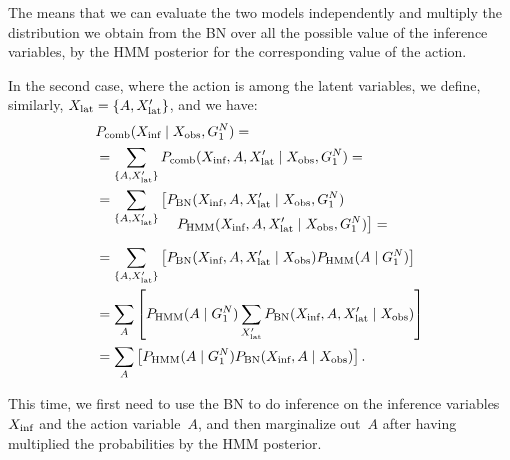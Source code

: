 The means that we can evaluate the two models independently and multiply the distribution we obtain from the \ac{BN} over all the possible value of the inference variables, by the \ac{HMM} posterior for the corresponding value of the action.

In the second case, where the action is among the latent variables, we define, similarly, $X_\text{lat} = \{A, X_\text{lat}^\prime\}$, and we have:
\begin{align*}
  & \pcomb(\xinf \given \xobs, G_1^N) = \\
  &= \sum_{\{A,\xlat^\prime\}} \pcomb(\xinf, A, \xlat^\prime \given \xobs, G_1^N)=\\
  &= \sum_{\{A,\xlat^\prime\}} \left[\pbn(\xinf, A, \xlat^\prime \given \xobs, G_1^N)\right. \\[-4mm]
    & \mspace{100mu} \left.\phmm(\xinf, A, \xlat^\prime \given \xobs, G_1^N)\right]= \\[2mm]
  &= \sum_{\{A,\xlat^\prime\}} \left[\pbn(\xinf, A, \xlat^\prime \given \xobs) \phmm(A \given G_1^N)\right] \\
  &= \sum_{A}\left[\phmm(A \given G_1^N)\sum_{\xlat^\prime} \pbn(\xinf, A, \xlat^\prime \given \xobs)\right] \\
  &= \sum_{A}\left[\phmm(A \given G_1^N) \pbn(\xinf, A \given \xobs)\right]. \\
\end{align*}

This time, we first need to use the \ac{BN} to do inference on the inference variables~$X_\text{inf}$ and the action variable~$A$, and then marginalize out~$A$ after having multiplied the probabilities by the \ac{HMM} posterior.

